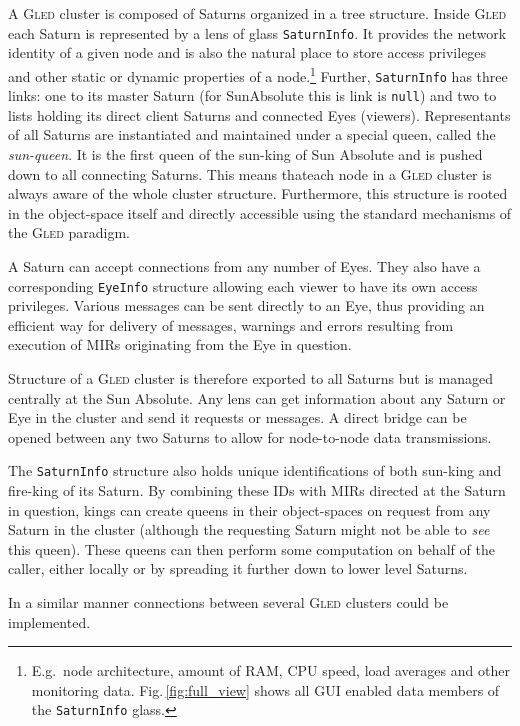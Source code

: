 \documentclass[final]{siamltex}
\def\gled{\textsc{Gled}\xspace}
\def\smalltt#1{{\small\texttt{#1}}}
\begin{document}
A \gled cluster is composed of Saturns organized in a tree structure.
Inside \gled each Saturn is represented by a lens of glass
\smalltt{SaturnInfo}. It provides the network identity of a given node
and is also the natural place to store access privileges and other
static or dynamic properties of a node.\footnote{E.g.\ node
  architecture, amount of RAM, CPU speed, load averages and other
  monitoring data.  Fig.\,\ref{fig:full_view} shows all GUI enabled data
  members of the \smalltt{SaturnInfo} glass.}  Further,
\smalltt{SaturnInfo} has three links: one to its master Saturn (for
SunAbsolute this is link is \smalltt{null}) and two to lists holding
its direct client Saturns and connected Eyes (viewers). Representants
of all Saturns are instantiated and maintained under a special queen,
called the \emph{sun-queen}. It is the first queen of the sun-king of
Sun Absolute and is pushed down to all connecting Saturns. This means
thateach node in a \gled cluster is always aware of the whole cluster
structure. Furthermore, this structure is rooted in the object-space
itself and directly accessible using the standard mechanisms of the
\gled paradigm.

A Saturn can accept connections from any number of Eyes. They also
have a corresponding \smalltt{EyeInfo} structure allowing each viewer
to have its own access privileges. Various messages can be sent
directly to an Eye, thus providing an efficient way for delivery of
messages, warnings and errors resulting from execution of MIRs
originating from the Eye in question.

Structure of a \gled cluster is therefore exported to all Saturns but
is managed centrally at the Sun Absolute. Any lens can get information
about any Saturn or Eye in the cluster and send it requests or
messages. A direct bridge can be opened between any two Saturns to
allow for node-to-node data transmissions.

The \smalltt{SaturnInfo} structure also holds unique identifications of
both sun-king and fire-king of its Saturn. By combining these IDs with
MIRs directed at the Saturn in question, kings can create queens in
their object-spaces on request from any Saturn in the cluster
(although the requesting Saturn might not be able to \emph{see} this
queen). These queens can then perform some computation on behalf of the
caller, either locally or by spreading it further down to lower level
Saturns.

In a similar manner connections between several \gled clusters could be
implemented.
\end{document}
